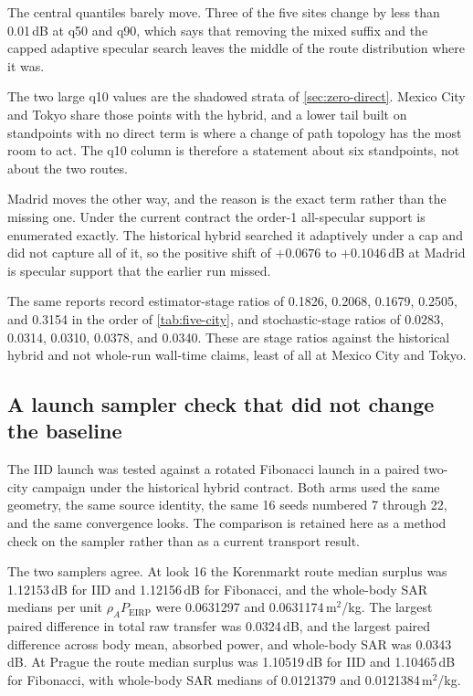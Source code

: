 The central quantiles barely move. Three of the five sites change by less than
0.01\,dB at q50 and q90, which says that removing the mixed suffix and the
capped adaptive specular search leaves the middle of the route distribution
where it was.

The two large q10 values are the shadowed strata of \cref{sec:zero-direct}.
Mexico City and Tokyo share those points with the hybrid, and a lower tail
built on standpoints with no direct term is where a change of path topology has
the most room to act. The q10 column is therefore a statement about six
standpoints, not about the two routes.

Madrid moves the other way, and the reason is the exact term rather than the
missing one. Under the current contract the order-1 all-specular support is
enumerated exactly. The historical hybrid searched it adaptively under a cap
and did not capture all of it, so the positive shift of $+0.0676$ to
$+0.1046$\,dB at Madrid is specular support that the earlier run missed.

The same reports record estimator-stage ratios of 0.1826, 0.2068, 0.1679,
0.2505, and 0.3154 in the order of \cref{tab:five-city}, and stochastic-stage
ratios of 0.0283, 0.0314, 0.0310, 0.0378, and 0.0340. These are stage ratios
against the historical hybrid and not whole-run wall-time claims, least of all
at Mexico City and Tokyo. 

\subsection{A launch sampler check that did not change the baseline}
\label{sec:sampler-check}

The IID launch was tested against a rotated Fibonacci launch in a paired
two-city campaign under the historical hybrid contract. Both arms used the same
geometry, the same source identity, the same 16 seeds numbered 7 through 22,
and the same convergence looks. The comparison is retained here as a method
check on the sampler rather than as a current transport result.

The two samplers agree. At look 16 the Korenmarkt route median surplus was
1.12153\,dB for IID and 1.12156\,dB for Fibonacci, and the whole-body SAR
medians per unit $\rho_A P_{\mathrm{EIRP}}$ were 0.0631297 and
0.0631174\,m$^2$/kg. The largest paired difference in total raw transfer was
0.0324\,dB, and the largest paired difference across body mean, absorbed power,
and whole-body SAR was 0.0343\,dB. At Prague the route median surplus was
1.10519\,dB for IID and 1.10465\,dB for Fibonacci, with whole-body SAR medians
of 0.0121379 and 0.0121384\,m$^2$/kg.

